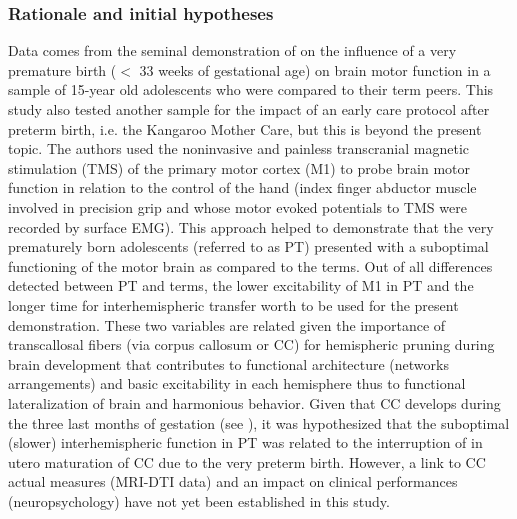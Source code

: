\documentclass[twocolumn]{svjour3}
\begin{document}
\subsubsection{Rationale and initial hypotheses}

Data comes from the seminal demonstration of \cite{schneider_cerebral_2012} on the influence of a very premature birth ($<$ 33 weeks of gestational age) on brain motor function in a sample of 15-year old adolescents who were compared to their term peers. This study also tested another sample for the impact of an early care protocol after preterm birth, i.e. the Kangaroo Mother Care, but this is beyond the present topic. The authors used the noninvasive and painless transcranial magnetic stimulation (TMS) of the primary motor cortex (M1) to probe brain motor function in relation to the control of the hand (index finger abductor muscle involved in precision grip and whose motor evoked potentials to TMS were recorded by surface EMG). This approach helped to demonstrate that the very prematurely born adolescents (referred to as PT) presented with a suboptimal functioning of the motor brain as compared to the terms. Out of all differences detected between PT and terms, the lower excitability of M1 in PT and the longer time for interhemispheric transfer worth to be used for the present demonstration. These two variables are related given the importance of transcallosal fibers (via corpus callosum or CC) for hemispheric pruning during brain development that contributes to functional architecture (networks arrangements) and basic excitability in each hemisphere thus to functional lateralization of brain and harmonious behavior. Given that CC develops during the three last months of gestation (see \cite{schneider_cerebral_2012}), it was hypothesized that the suboptimal (slower) interhemispheric function in PT was related to the interruption of in utero maturation of CC due to the very preterm birth. However, a link to CC actual measures (MRI-DTI data) and an impact on clinical performances (neuropsychology) have not yet been established in this study.
\end{document}
